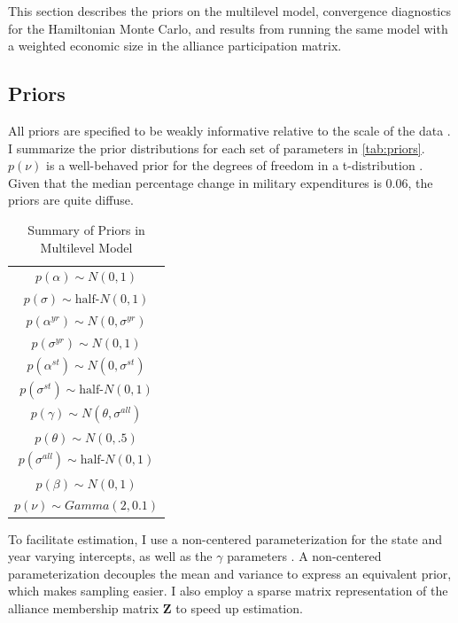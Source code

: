 \documentclass[12pt]{article}
\begin{document}
This section describes the priors on the multilevel model, convergence diagnostics for the Hamiltonian Monte Carlo, and results from running the same model with a weighted economic size in the alliance participation matrix. 


\subsection{Priors} 

All priors are specified to be weakly informative relative to the scale of the data \citep{Gelmanetal2017}. 
I summarize the prior distributions for each set of parameters in \autoref{tab:priors}. 
$p(\nu)$ is a well-behaved prior for the degrees of freedom in a t-distribution \citep{JuarezSteele2010}. 
Given that the median percentage change in military expenditures is 0.06, the priors are quite diffuse. 


\begin{table} %
\begin{center}
\begin{tabular}{c} 
$ p(\alpha) \sim N(0, 1)$  \\
$ p(\sigma) \sim \mbox{half-}N(0, 1) $ \\
$ p(\alpha^{yr}) \sim N(0, \sigma^{yr}) $ \\ 
$ p(\sigma^{yr}) \sim N(0, 1) $ \\
$ p(\alpha^{st}) \sim N(0, \sigma^{st}) $ \\ 
$ p(\sigma^{st}) \sim \mbox{half-}N(0, 1) $ \\ 
$ p(\gamma) \sim N(\theta, \sigma^{all}) $ \\ 
$ p(\theta) \sim N(0, .5) $ \\
$ p(\sigma^{all}) \sim \mbox{half-}N(0, 1) $ \\
$ p(\beta) \sim N(0, 1) $ \\
$ p(\nu) \sim Gamma(2, 0.1)$ 
\end{tabular} 
\caption{Summary of Priors in Multilevel Model} 
\label{tab:priors}
\end{center} 
\end{table} 


To facilitate estimation, I use a non-centered parameterization for the state and year varying intercepts, as well as the $\gamma$ parameters \citep{BetancourtGirolani2015}. 
A non-centered parameterization decouples the mean and variance to express an equivalent prior, which makes sampling easier. 
I also employ a sparse matrix representation of the alliance membership matrix $\textbf{Z}$ to speed up estimation. 
\end{document}
